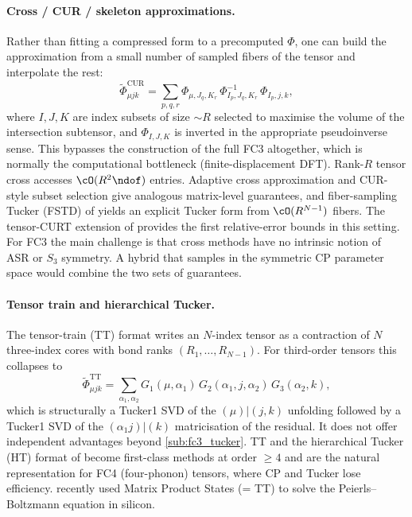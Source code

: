 \paragraph{Cross / CUR / skeleton approximations.} Rather than fitting a compressed form to a
precomputed $\Phi$, one can build the approximation from a small number of sampled fibers of the
tensor and interpolate the rest:
\begin{equation}
  \tilde\Phi_{\mu j k}^{\mathrm{CUR}}
  = \sum_{p,q,r}\Phi_{\mu,J_q,K_r}\,
    \Phi_{I_p,J_q,K_r}^{-1}\,\Phi_{I_p,j,k},
\end{equation}
where $I,J,K$ are index subsets of size $\sim R$ selected to maximise the volume of the
intersection subtensor, and $\Phi_{I,J,K}$ is inverted in the appropriate pseudoinverse sense.
This bypasses the construction of the full FC3 altogether, which is normally the computational
bottleneck (finite-displacement DFT). Rank-$R$ tensor cross
\cite{oseledets_tt-cross_2010, savostyanov_quasioptimality_2014} accesses $\cO(R^{2}\ndof)$ entries.
Adaptive cross approximation \cite{bebendorf_approximation_2000} and CUR-style subset selection
\cite{goreinov_theory_1997, mahoney_cur_2009} give analogous matrix-level
guarantees, and fiber-sampling Tucker (FSTD) of \citet{caiafa_generalizing_2010} yields an explicit
Tucker form from $\cO(R^{N-1})$ fibers. The tensor-CURT extension of
\citet{song_relative_2019} provides the first relative-error bounds in this setting. For
FC3 the main challenge is that cross methods have no intrinsic notion of ASR or $S_3$ symmetry.
A hybrid that samples in the symmetric CP parameter space would combine the two sets of
guarantees.

\paragraph{Tensor train and hierarchical Tucker.} The tensor-train (TT) format
\cite{oseledets_tensor-train_2011} writes an $N$-index tensor as a contraction of $N$ three-index
cores with bond ranks $(R_1,\dots,R_{N-1})$. For third-order tensors this collapses to
\begin{equation}
  \tilde\Phi_{\mu j k}^{\mathrm{TT}}
  = \sum_{\alpha_1,\alpha_2} G_1(\mu,\alpha_1)\,
    G_2(\alpha_1,j,\alpha_2)\,G_3(\alpha_2,k),
\end{equation}
which is structurally a Tucker1 SVD of the $(\mu)|(j,k)$ unfolding followed by a Tucker1 SVD of
the $(\alpha_1 j)|(k)$ matricisation of the residual. It does not offer independent advantages
beyond \cref{sub:fc3_tucker}. TT and the hierarchical Tucker (HT) format of
\citet{hackbusch_tensor_2019} become first-class methods at order
$\ge 4$ and are the natural representation for FC4 (four-phonon) tensors, where CP and Tucker
lose efficiency. \citet{lee_solving_2026} recently used Matrix Product States (= TT) to solve the
Peierls--Boltzmann equation in silicon.


